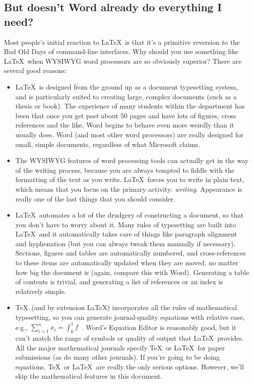 \documentclass[12pt,a4paper]{article}
\begin{document}
\subsection{But doesn't Word already do everything I need?}
\label{sec:Word}

Most people's initial reaction to \LaTeX\ is that it's a primitive
reversion to the Bad Old Days of command-line interfaces. Why should you
use something like \LaTeX\ when WYSIWYG word processors are so obviously
superior? There are several good reasons:

\begin{itemize}

	\item \LaTeX\ is designed from the ground up as a document
	typesetting system, and is particularly suited to creating large,
	complex documents (such as a thesis or book). The experience of many
	students within the department has been that once you get past about
	50 pages and have lots of figures, cross references and the like,
	Word begins to behave even more weirdly than it usually does. Word
	(and most other word processors) are really designed for small,
	simple documents, regardless of what Microsoft claims.

	\item The WYSIWYG features of word processing tools can actually get
	in the way of the writing process, because you are always tempted to
	fiddle with the formatting of the text as you write. \LaTeX\ forces
	you to write in plain text, which means that you focus on the
	primary activity: \emph{writing}. Appearance is really one of the
	last things that you should consider.

	\item \LaTeX\ automates a lot of the drudgery of constructing a
	document, so that you don't have to worry about it. Many rules of
	typesetting are built into \LaTeX\, and it automatically takes care
	of things like paragraph alignment and hyphenation (but you can
	always tweak them manually if necessary). Sections, figures and
	tables are automatically numbered, and cross-references to these
	items are automatically updated when they are moved, no matter how
	big the document is (again, compare this with Word). Generating a
	table of contents is trivial, and generating a list of references or
	an index is relatively simple.

	\item \TeX\ (and by extension \LaTeX) incorporates all the rules of
	mathematical typesetting, so you can generate journal-quality
	equations with relative ease, e.g., \(\sum_{i=1}^{n} x_{i} =
	\int_{0}^{1} f\)~\cite{UsersGuide}. Word's Equation Editor is
	reasonably good, but it can't match the range of symbols or quality
	of output that \LaTeX\ provides. All the major mathematical journals
	specify \TeX\ or \LaTeX\ for paper submissions (as do many other
	journals). If you're going to be doing equations, \TeX\ or \LaTeX\
	are really the only serious options. However, we'll skip the
	mathematical features in this document.


\end{itemize}
\end{document}
